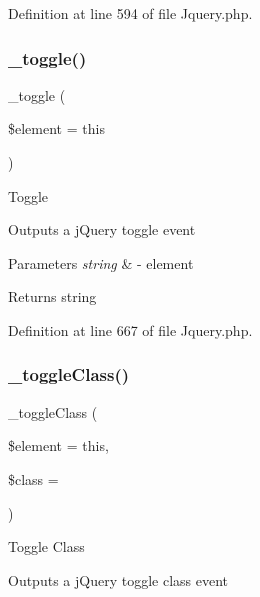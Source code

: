 Definition at line 594 of file Jquery.\+php.

\mbox{\label{class_c_i___jquery_aa1c932f4aba1d5c8259da4dfd7e7a106}} 
\subsubsection{\texorpdfstring{\_toggle()}{\_toggle()}}
{\footnotesize\ttfamily \+\_\+toggle (\begin{DoxyParamCaption}\item[{}]{\$element = {\ttfamily \textquotesingle{}this\textquotesingle{}} }\end{DoxyParamCaption})\hspace{0.3cm}{\ttfamily [protected]}}

Toggle

Outputs a j\+Query toggle event


\begin{DoxyParams}{Parameters}
{\em string} & -\/ element \\
\hline
\end{DoxyParams}
\begin{DoxyReturn}{Returns}
string 
\end{DoxyReturn}


Definition at line 667 of file Jquery.\+php.

\mbox{\label{class_c_i___jquery_afcfe440e86ec038bc62ac9be2296313b}} 
\subsubsection{\texorpdfstring{\_toggleClass()}{\_toggleClass()}}
{\footnotesize\ttfamily \+\_\+toggle\+Class (\begin{DoxyParamCaption}\item[{}]{\$element = {\ttfamily \textquotesingle{}this\textquotesingle{}},  }\item[{}]{\$class = {\ttfamily \textquotesingle{}\textquotesingle{}} }\end{DoxyParamCaption})\hspace{0.3cm}{\ttfamily [protected]}}

Toggle Class

Outputs a j\+Query toggle class event


